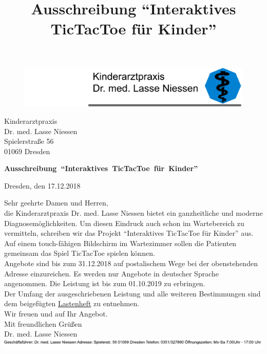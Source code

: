 \documentclass[12pt]{article}
\title{Ausschreibung "`Interaktives TicTacToe für Kinder"'}
\begin{document}
\begin{center}
\begin{figure}
\includegraphics[scale=0.9]{banner.pdf} %
\end{figure}
\end{center}

\small
Kinderarztpraxis\\ Dr. med. Lasse Niessen\\
Spielerstraße 56\\
01069 Dresden\\

\vspace*{10mm}

\large \textbf{Ausschreibung\ "`Interaktives\ TicTacToe\ für\ Kinder"'}

\normalsize
\begin{flushright}
Dresden, den 17.12.2018\\
\end{flushright}

\vspace*{7mm}

Sehr geehrte Damen und Herren,\\

die Kinderarztpraxis Dr. med. Lasse Niessen bietet ein ganzheitliche und moderne Diagnosemöglichkeiten. Um diesen Eindruck auch schon im Wartebereich zu vermitteln, schreiben wir das Projekt "`Interaktives TicTacToe für Kinder"' aus. Auf einem touch-fähigen Bildschirm im Wartezimmer sollen die Patienten gemeinsam das Spiel TicTacToe spielen können.\\

Angebote sind bis zum 31.12.2018 auf postalischem Wege bei der obenstehenden Adresse einzureichen. Es werden nur Angebote in deutscher Sprache angenommen. Die Leistung ist bis zum 01.10.2019 zu erbringen.\\

Der Umfang der ausgeschriebenen Leistung und alle weiteren Bestimmungen sind dem beigefügten \href{run:./lastenheft.pdf}{Lastenheft} zu entnehmen.\\

Wir freuen und auf Ihr Angebot.\\

Mit freundlichen Grüßen\\
Dr. med. Lasse Niessen\\

\vspace*{\fill}
\includegraphics[scale=0.9]{footer.pdf}
\thispagestyle{empty}
\end{document}
